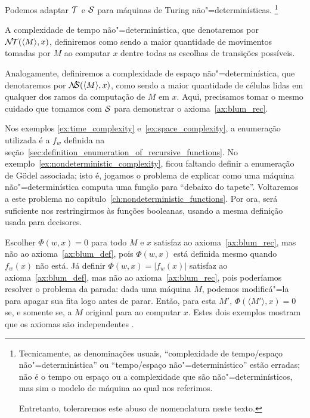 \begin{example}
    \label{ex:nondeterministic_complexity}
    Podemos adaptar ${\mathcal{T}}$ e ${\mathcal{S}}$
    para máquinas de Turing não"=determinísticas.%
    \footnote{
        Tecnicamente,
        as denominações usuais,
        ``complexidade de tempo/espaço não"=determinística''
        ou ``tempo/espaço não"=determinístico''
        estão erradas;
        não é o tempo ou espaço ou a complexidade que são não"=determinísticos,
        mas sim o modelo de máquina ao qual nos referimos.

        Entretanto, toleraremos este abuso de nomenclatura neste texto.
    }

    A complexidade de tempo não"=determinística,
    que denotaremos por ${\mathcal{N\!T}}(\langle M \rangle, x)$,
    definiremos como sendo a maior quantidade de movimentos
    tomadas por $M$ ao computar $x$
    dentre todas as escolhas de transições possíveis.

    Analogamente,
    definiremos a complexidade de espaço não"=determinística,
    que denotaremos por ${\mathcal{N\!\!S}}(\langle M \rangle, x)$,
    como sendo a maior quantidade de células lidas
    em qualquer dos ramos da computação de $M$ em $x$.
    Aqui, precisamos tomar o mesmo cuidado que tomamos
    com ${\mathcal{S}}$ para demonstrar o axioma~\ref{ax:blum_rec}.
\end{example}

Nos exemplos \ref{ex:time_complexity} e~\ref{ex:space_complexity},
a enumeração utilizada é a $f_w$
definida na seção~\ref{sec:definition_enumeration_of_recursive_functions}.
No exemplo~\ref{ex:nondeterministic_complexity},
ficou faltando definir a enumeração de Gödel associada;
isto é, jogamos o problema de
explicar como uma máquina não"=determinística computa uma função
para ``debaixo do tapete''.
Voltaremos a este problema no capítulo~\ref{ch:nondeterministic_functions}.
Por ora,
será suficiente nos restringirmos às funções booleanas,
usando a mesma definição usada para decisores.

\begin{example}
    Escolher $\Phi(w, x) = 0$ para todo $M$ e $x$
    satisfaz ao axioma~\ref{ax:blum_rec},
    mas não ao axioma~\ref{ax:blum_def},
    pois $\Phi(w, x)$ está definida mesmo quando $f_w(x)$ não está.
    Já definir $\Phi(w, x) = |f_w(x)|$
    satisfaz ao axioma~\ref{ax:blum_def},
    mas não ao axioma~\ref{ax:blum_rec},
    pois poderíamos resolver o problema da parada:
    dada uma máquina $M$, podemos modificá"=la
    para apagar sua fita logo antes de parar.
    Então, para esta $M'$,
    $\Phi(\langle M' \rangle, x) = 0$ se, e somente se,
    a $M$ original para ao computar $x$.
    Estes dois exemplos mostram que os axiomas são independentes
    \cite[p.~324]{Blum1967}.
\end{example}

